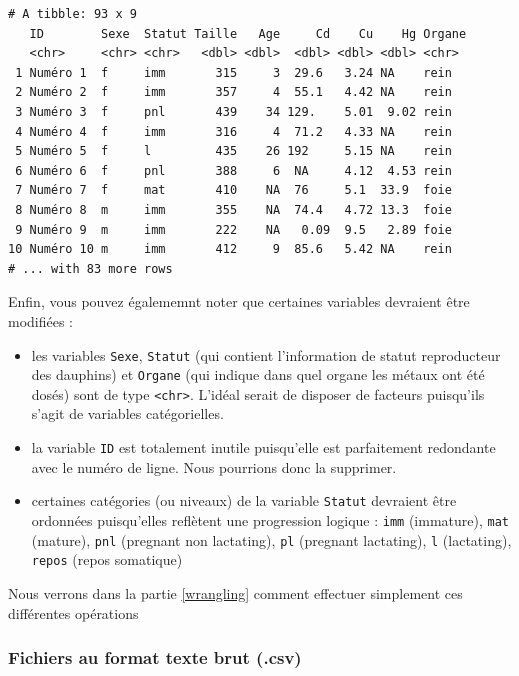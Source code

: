 \documentclass[a4paperpaper,]{article}
\providecommand{\tightlist}{%
  \setlength{\itemsep}{0pt}\setlength{\parskip}{0pt}}
\theoremstyle{definition}
\theoremstyle{definition}
\theoremstyle{definition}
\theoremstyle{remark}
\begin{document}
\begin{verbatim}
# A tibble: 93 x 9
   ID        Sexe  Statut Taille   Age     Cd    Cu    Hg Organe
   <chr>     <chr> <chr>   <dbl> <dbl>  <dbl> <dbl> <dbl> <chr> 
 1 Numéro 1  f     imm       315     3  29.6   3.24 NA    rein  
 2 Numéro 2  f     imm       357     4  55.1   4.42 NA    rein  
 3 Numéro 3  f     pnl       439    34 129.    5.01  9.02 rein  
 4 Numéro 4  f     imm       316     4  71.2   4.33 NA    rein  
 5 Numéro 5  f     l         435    26 192     5.15 NA    rein  
 6 Numéro 6  f     pnl       388     6  NA     4.12  4.53 rein  
 7 Numéro 7  f     mat       410    NA  76     5.1  33.9  foie  
 8 Numéro 8  m     imm       355    NA  74.4   4.72 13.3  foie  
 9 Numéro 9  m     imm       222    NA   0.09  9.5   2.89 foie  
10 Numéro 10 m     imm       412     9  85.6   5.42 NA    rein  
# ... with 83 more rows
\end{verbatim}

Enfin, vous pouvez égalememnt noter que certaines variables devraient
être modifiées :

\begin{itemize}
\tightlist
\item
  les variables \texttt{Sexe}, \texttt{Statut} (qui contient
  l'information de statut reproducteur des dauphins) et \texttt{Organe}
  (qui indique dans quel organe les métaux ont été dosés) sont de type
  \texttt{\textless{}chr\textgreater{}}. L'idéal serait de disposer de
  facteurs puisqu'ils s'agit de variables catégorielles.
\item
  la variable \texttt{ID} est totalement inutile puisqu'elle est
  parfaitement redondante avec le numéro de ligne. Nous pourrions donc
  la supprimer.
\item
  certaines catégories (ou niveaux) de la variable \texttt{Statut}
  devraient être ordonnées puisqu'elles reflètent une progression
  logique : \texttt{imm} (immature), \texttt{mat} (mature), \texttt{pnl}
  (pregnant non lactating), \texttt{pl} (pregnant lactating), \texttt{l}
  (lactating), \texttt{repos} (repos somatique)
\end{itemize}

Nous verrons dans la partie \ref{wrangling} comment effectuer simplement
ces différentes opérations

\subsubsection{Fichiers au format texte brut (.csv)}\label{plaintext}
\end{document}
